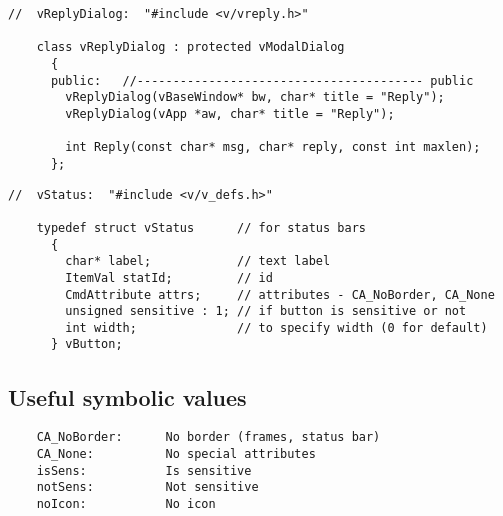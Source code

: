 
\footnotesize
\begin{verbatim}
//  vReplyDialog:  "#include <v/vreply.h>"

    class vReplyDialog : protected vModalDialog
      {
      public:   //---------------------------------------- public
        vReplyDialog(vBaseWindow* bw, char* title = "Reply");
        vReplyDialog(vApp *aw, char* title = "Reply");

        int Reply(const char* msg, char* reply, const int maxlen);
      };
\end{verbatim}
\normalfont\normalsize


\footnotesize
\begin{verbatim}
//  vStatus:  "#include <v/v_defs.h>"

    typedef struct vStatus      // for status bars
      {
        char* label;            // text label
        ItemVal statId;         // id
        CmdAttribute attrs;     // attributes - CA_NoBorder, CA_None
        unsigned sensitive : 1; // if button is sensitive or not
        int width;              // to specify width (0 for default)
      } vButton;
\end{verbatim}
\normalfont\normalsize

\subsection*{Useful symbolic values}

\footnotesize
\begin{verbatim}
    CA_NoBorder:      No border (frames, status bar)
    CA_None:          No special attributes
    isSens:           Is sensitive
    notSens:          Not sensitive
    noIcon:           No icon
\end{verbatim}
\normalfont\normalsize


